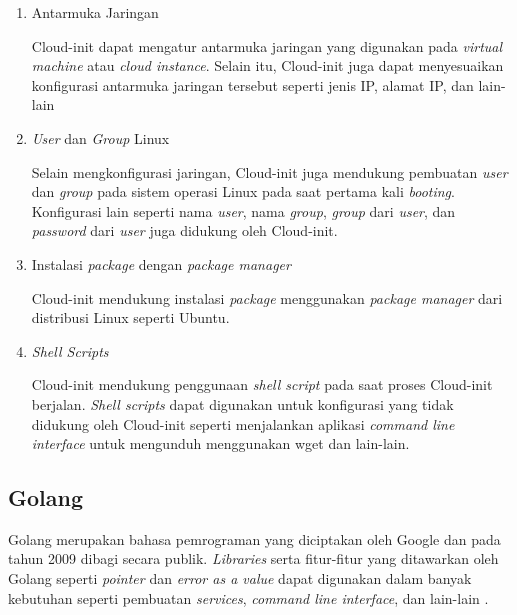 \begin{enumerate}
  
  \item Antarmuka Jaringan

    Cloud-init dapat mengatur antarmuka jaringan yang digunakan pada \emph{virtual machine}
    atau \emph{cloud instance}. Selain itu, Cloud-init juga dapat menyesuaikan konfigurasi
    antarmuka jaringan tersebut seperti jenis IP, alamat IP, dan lain-lain

  \item \emph{User} dan \emph{Group} Linux

    Selain mengkonfigurasi jaringan, Cloud-init juga mendukung pembuatan \emph{user} dan \emph{group} pada
    sistem operasi Linux pada saat pertama kali \emph{booting}. Konfigurasi lain seperti nama \emph{user},
    nama \emph{group}, \emph{group} dari \emph{user}, dan \emph{password} dari \emph{user} juga didukung
    oleh Cloud-init.

  \item Instalasi \emph{package} dengan \emph{package manager}

    Cloud-init mendukung instalasi \emph{package} menggunakan \emph{package manager} dari distribusi Linux
    seperti Ubuntu. 

  \item \emph{Shell Scripts}

    Cloud-init mendukung penggunaan \emph{shell script} pada saat proses Cloud-init
    berjalan. \emph{Shell scripts} dapat digunakan untuk konfigurasi yang tidak didukung
    oleh Cloud-init seperti menjalankan aplikasi \emph{command line interface} untuk mengunduh
    menggunakan wget dan lain-lain.

\end{enumerate}

\subsection{Golang}

Golang merupakan bahasa pemrograman yang diciptakan oleh Google dan pada 
tahun 2009 dibagi secara publik. \emph{Libraries}
serta fitur-fitur yang ditawarkan oleh Golang seperti \emph{pointer} dan \emph{error as a value}
dapat digunakan dalam banyak kebutuhan seperti pembuatan \emph{services}, \emph{command line interface},
dan lain-lain \parencite{go-website}.
